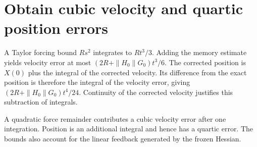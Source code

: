 \documentclass[11pt,a4paper]{article}
\begin{document}
\section{\texorpdfstring{Obtain cubic velocity and quartic position errors}{Obtain cubic velocity and quartic position errors}}


A Taylor forcing bound \(Rs^{2}\) integrates to \(Rt^{3}/3\). Adding the memory estimate yields velocity error at most \((2R+\|H_{0}\|G_{0})t^{3}/6\). The corrected position is \(X(0)\) plus the integral of the corrected velocity. Its difference from the exact position is therefore the integral of the velocity error, giving \((2R+\|H_{0}\|G_{0})t^{4}/24\). Continuity of the corrected velocity justifies this subtraction of integrals.



A quadratic force remainder contributes a cubic velocity error after one integration. Position is an additional integral and hence has a quartic error. The bounds also account for the linear feedback generated by the frozen Hessian.
\end{document}
